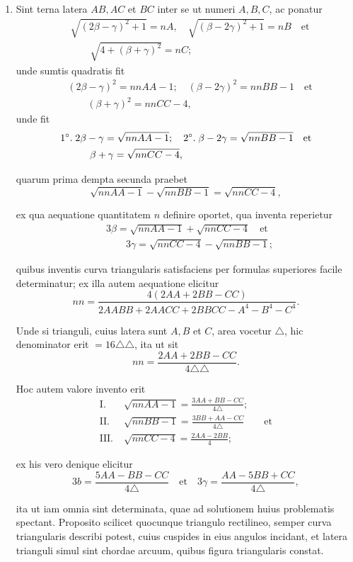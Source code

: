 \documentclass[10pt,a4paper]{article}
\begin{document}
\begin{paracol}{2}
\begin{enumerate}[topsep=1px]
		\switchcolumn*
		
		\item Sint terna latera $AB, AC$ et $BC$ inter se ut numeri $A, B, C$, ac ponatur
		\begin{align*}
			&\sqrt{(2\beta - \gamma)^2+1} = nA, \quad \sqrt{(\beta-2\gamma)^2+1} = nB \quad \text{et}\\
			&\qquad \sqrt{4+(\beta + \gamma)^2}= nC;
		\end{align*}
		unde sumtis quadratis fit
		\begin{align*}
			&(2\beta- \gamma)^2 = nnAA - 1; \quad (\beta-2\gamma )^2= nnBB-1\quad \text{et}\\
			&\qquad (\beta+\gamma)^2= nnCC-4,
		\end{align*}
		unde fit
		\begin{align*}
			&\text{1}\degree.\; 2\beta - \gamma = \sqrt{nnAA-1}; \quad \text{2}\degree.\; \beta - 2\gamma = \sqrt{nnBB-1}\quad \text{et}\\
			&\qquad \quad \beta + \gamma = \sqrt{nnCC-4},
		\end{align*}
		\par quarum prima dempta secunda praebet
		\[
			\sqrt{nnAA-1}-\sqrt{nnBB-1} = \sqrt{nnCC-4},
		\]
		\par ex qua aequatione quantitatem $n$ definire oportet, qua inventa reperietur
		\begin{align*}
			&3\beta = \sqrt{nnAA-1}+\sqrt{nnCC-4} \quad \text{et}\\
			&\qquad 3\gamma = \sqrt{nnCC-4}-\sqrt{nnBB-1};
		\end{align*}
		\par quibus inventis curva triangularis satisfaciens per formulas superiores facile determinatur; ex illa autem aequatione elicitur
		\[
			nn = \frac{4(2AA+2BB-CC)}{2AABB+2AACC+2BBCC-A^4-B^4-C^4}.
		\]
		\par Unde si trianguli, cuius latera sunt $A, B$ et $C$, area vocetur $\triangle$, hic denominator erit $=16 \triangle \triangle$, ita ut sit
		\[
			nn=\frac{2AA+2BB-CC}{4 \triangle \triangle}.
		\]
		\par Hoc autem valore invento erit
		\begin{align*}
			\text{I}. \;& \sqrt{nnAA-1} = \frac{3AA+BB-CC}{4\triangle};\\
			\text{II}. \; & \sqrt{nnBB-1} = \frac{3BB+AA-CC}{4\triangle} \qquad \text{et}\\
			\text{III}. \;& \sqrt{nnCC-4} = \frac{2AA-2BB}{4};
		\end{align*}
		\par ex his vero denique elicitur
		\[
			3b = \frac{5AA-BB-CC}{4\triangle} \quad \text{et} \quad 3\gamma = \frac{AA-5BB+CC}{4\triangle},
		\]
		\par ita ut iam omnia sint determinata, quae ad solutionem huius problematis spectant. Proposito scilicet quocunque triangulo rectilineo, semper curva triangularis describi potest, cuius cuspides in eius angulos incidant, et latera trianguli simul sint chordae arcuum, quibus figura triangularis constat.
		

\end{enumerate}
\end{paracol}
\end{document}
